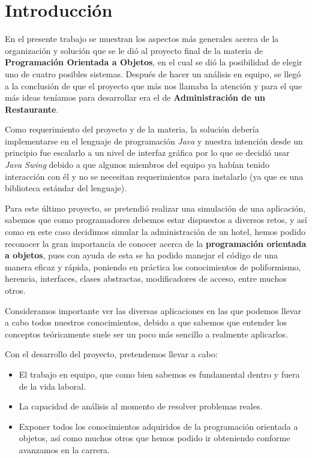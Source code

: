 \section*{Introducción}

En el presente trabajo se muestran los aspectos más generales acerca de la organización y solución
que se le dió al proyecto final de la materia de \textbf{Programación 
Orientada a Objetos}, en el cual se dió la posibilidad de elegir uno de cuatro 
posibles sistemas. Después de hacer un análisis en equipo, se llegó a la 
conclusión de que el proyecto que más nos llamaba la atención y para el que 
más ideas teníamos para desarrollar era el de \textbf{Administración de un 
Restaurante}.

Como requerimiento del proyecto y de la materia, la solución debería 
implementarse en el lenguaje de programación \textit{Java} y nuestra intención desde un 
principio fue escalarlo a un nivel de interfaz gráfica por lo que se decidió 
usar \textit{Java Swing} debido a que algunos miembros del equipo ya habían
tenido interacción con él y no se necesitan requerimientos para instalarlo (ya 
que es una biblioteca estándar del lenguaje).

Para este último proyecto, se pretendió realizar una simulación de una aplicación, sabemos
que como programadores debemos estar dispuestos a diversos retos, y así como en este caso decidimos
simular la administración de un hotel, hemos podido reconocer la gran importancia de conocer acerca de 
la \textbf{programación orientada a objetos}, pues con ayuda de esta se ha podido manejar el código de una manera 
eficaz y rápida, poniendo en práctica los conocimientos de poliformismo, herencia, interfaces, clases abstractas,
modificadores de acceso, entre muchos otros. 

Consideramos importante ver las diversas aplicaciones en las que podemos llevar a cabo todos nuestros 
conocimientos, debido a que sabemos que entender los conceptos teóricamente suele ser un poco más 
sencillo a realmente aplicarlos.

Con el desarrollo del proyecto, pretendemos llevar a cabo: 
\begin{itemize}
    \item El trabajo en equipo, que como bien sabemos es fundamental dentro y fuera de la vida laboral. 
    \item La capacidad de análisis al momento de resolver problemas reales. 
    \item Exponer todos los conocimientos adquiridos de la programación orientada a objetos, así como muchos otros
    que hemos podido ir obteniendo conforme avanzamos en la carrera. 
\end{itemize}

